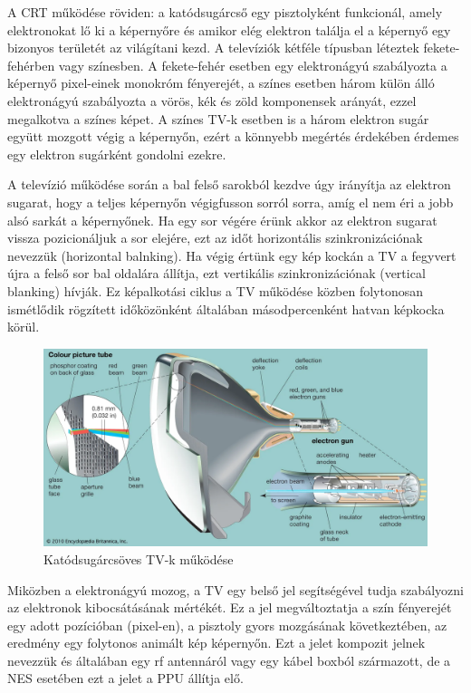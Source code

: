 	A CRT működése röviden: a katódsugárcső egy pisztolyként funkcionál, amely elektronokat lő ki a képernyőre és amikor elég elektron találja el a képernyő egy bizonyos területét az világítani kezd. A televíziók kétféle típusban léteztek fekete-fehérben vagy színesben. A fekete-fehér esetben egy elektronágyú szabályozta a képernyő pixel-einek monokróm fényerejét, a színes esetben három külön álló elektronágyú szabályozta a vörös, kék és zöld komponensek arányát, ezzel megalkotva a színes képet. A színes TV-k esetben is a három elektron sugár együtt mozgott végig a képernyőn, ezért a könnyebb megértés érdekében érdemes egy elektron sugárként gondolni ezekre. 
	
	A televízió működése során a bal felső sarokból kezdve úgy irányítja az elektron sugarat, hogy a teljes képernyőn végigfusson sorról sorra, amíg el nem éri a jobb alsó sarkát a képernyőnek. Ha egy sor végére érünk akkor az elektron sugarat vissza pozicionáljuk a sor elejére, ezt az időt horizontális szinkronizációnak nevezzük (horizontal balnking). Ha végig értünk egy kép kockán a TV a fegyvert újra a felső sor bal oldalára állítja, ezt vertikális szinkronizációnak (vertical blanking) hívják. Ez képalkotási ciklus a TV működése közben folytonosan ismétlődik rögzített időközönként általában másodpercenként hatvan képkocka körül. 
	
	\begin{figure}[H]
		\centering
		\includegraphics[width=150mm, keepaspectratio]{figures/CRT-TV}
		\caption{Katódsugárcsöves TV-k működése}
		\label{fig:CRT-TV}
	\end{figure}
	
	Miközben a elektronágyú mozog, a TV egy belső jel segítségével tudja szabályozni az elektronok kibocsátásának mértékét. Ez a jel megváltoztatja a szín fényerejét egy adott pozícióban (pixel-en), a pisztoly gyors mozgásának következtében, az eredmény egy folytonos animált kép képernyőn. Ezt a jelet kompozit jelnek nevezzük és általában egy rf antennáról vagy egy kábel boxból származott, de a NES esetében ezt a jelet a PPU állítja elő. 
	
